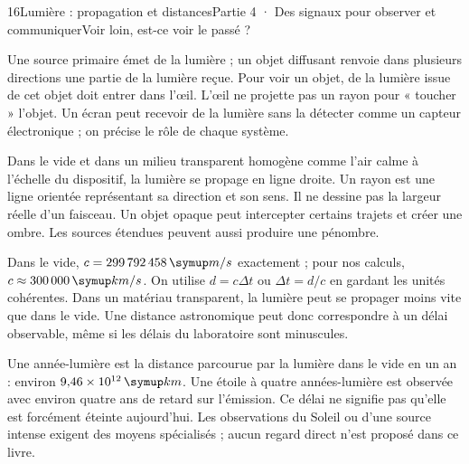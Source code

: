 \begin{ouverture}[college4]{16}{Lumière : propagation et distances}{Partie 4 · Des signaux pour observer et communiquer}{Voir loin, est-ce voir le passé ?}
\end{ouverture}
\label{ess-16}
Une source primaire émet de la lumière ; un objet diffusant renvoie dans plusieurs directions une partie de la lumière reçue. Pour voir un objet, de la lumière issue de cet objet doit entrer dans l’œil. L’œil ne projette pas un rayon pour « toucher » l’objet. Un écran peut recevoir de la lumière sans la détecter comme un capteur électronique ; on précise le rôle de chaque système.\par
{}
Dans le vide et dans un milieu transparent homogène comme l’air calme à l’échelle du dispositif, la lumière se propage en ligne droite. Un rayon est une ligne orientée représentant sa direction et son sens. Il ne dessine pas la largeur réelle d’un faisceau. Un objet opaque peut intercepter certains trajets et créer une ombre. Les sources étendues peuvent aussi produire une pénombre.\par
\clearpage
{}
Dans le vide, $c=299\,792\,458\unite{m/s}$ exactement ; pour nos calculs, $c\approx300\,000\unite{km/s}$. On utilise $d=c\Delta t$ ou $\Delta t=d/c$ en gardant les unités cohérentes. Dans un matériau transparent, la lumière peut se propager moins vite que dans le vide. Une distance astronomique peut donc correspondre à un délai observable, même si les délais du laboratoire sont minuscules.\par
{}
Une année-lumière est la distance parcourue par la lumière dans le vide en un an : environ $9{,}46\times10^{12}\unite{km}$. Une étoile à quatre années-lumière est observée avec environ quatre ans de retard sur l’émission. Ce délai ne signifie pas qu’elle est forcément éteinte aujourd’hui. Les observations du Soleil ou d’une source intense exigent des moyens spécialisés ; aucun regard direct n’est proposé dans ce livre.\par
